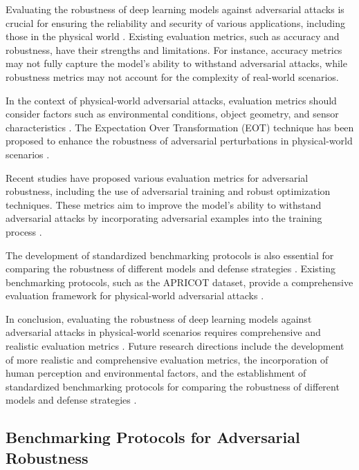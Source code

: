 \documentclass[11pt,a4paper]{article}
\begin{document}
Evaluating the robustness of deep learning models against adversarial attacks is crucial for ensuring the reliability and security of various applications, including those in the physical world \cite{arxiv:1810.00069}. Existing evaluation metrics, such as accuracy and robustness, have their strengths and limitations. For instance, accuracy metrics may not fully capture the model's ability to withstand adversarial attacks, while robustness metrics may not account for the complexity of real-world scenarios.

In the context of physical-world adversarial attacks, evaluation metrics should consider factors such as environmental conditions, object geometry, and sensor characteristics \cite{arxiv:1707.08945}. The Expectation Over Transformation (EOT) technique has been proposed to enhance the robustness of adversarial perturbations in physical-world scenarios \cite{doi:10.1109/cvpr42600.2020.01426}. 

Recent studies have proposed various evaluation metrics for adversarial robustness, including the use of adversarial training and robust optimization techniques. These metrics aim to improve the model's ability to withstand adversarial attacks by incorporating adversarial examples into the training process \cite{doi:10.24963/ijcai.2021/694}. 

The development of standardized benchmarking protocols is also essential for comparing the robustness of different models and defense strategies \cite{doi:10.1109/tgrs.2022.3225306}. Existing benchmarking protocols, such as the APRICOT dataset, provide a comprehensive evaluation framework for physical-world adversarial attacks \cite{doi:10.1007/978-3-030-58589-1_3}.

In conclusion, evaluating the robustness of deep learning models against adversarial attacks in physical-world scenarios requires comprehensive and realistic evaluation metrics \cite{doi:10.1109/access.2022.3208131}. Future research directions include the development of more realistic and comprehensive evaluation metrics, the incorporation of human perception and environmental factors, and the establishment of standardized benchmarking protocols for comparing the robustness of different models and defense strategies \cite{doi:10.1007/s11633-019-1211-x}.


\subsection{Benchmarking Protocols for Adversarial Robustness}
\end{document}
